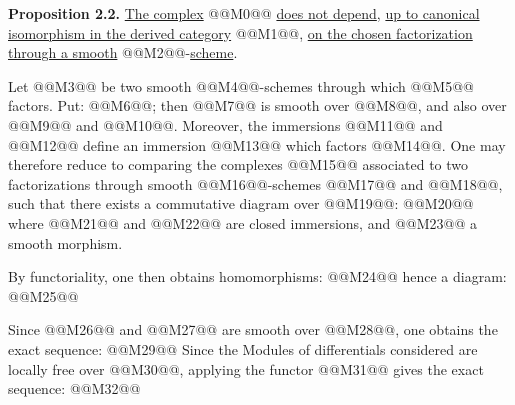 \textbf{Proposition 2.2.} \uline{The complex} @@M0@@ \uline{does not depend}, \uline{up to canonical isomorphism in the derived category} @@M1@@, \uline{on the chosen factorization through a smooth} @@M2@@-\uline{scheme}.

Let @@M3@@ be two smooth @@M4@@-schemes through which @@M5@@ factors. Put: @@M6@@; then @@M7@@ is smooth over @@M8@@, and also over @@M9@@ and @@M10@@. Moreover, the immersions @@M11@@ and @@M12@@ define an immersion @@M13@@ which factors @@M14@@. One may therefore reduce to comparing the complexes @@M15@@ associated to two factorizations through smooth @@M16@@-schemes @@M17@@ and @@M18@@, such that there exists a commutative diagram over @@M19@@:
@@M20@@
where @@M21@@ and @@M22@@ are closed immersions, and @@M23@@ a smooth morphism.

By functoriality, one then obtains homomorphisms:
@@M24@@
hence a diagram:
@@M25@@

Since @@M26@@ and @@M27@@ are smooth over @@M28@@, one obtains the exact sequence:
@@M29@@
Since the Modules of differentials considered are locally free over @@M30@@, applying the functor @@M31@@ gives the exact sequence:
@@M32@@
